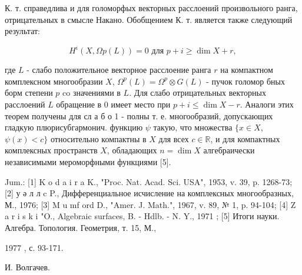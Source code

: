 \documentclass[10pt]{article}
\begin{document}
К. т. справедлива и для голоморфых векторных расслоений произвольного ранга, отрицательных в смысле Накано. Обобщением К. т. является также следующий результат:



\[

H^{i}(X, \Omega p(L))=0 \text { для } p+i \geqslant \operatorname{dim} X+r,

\]



где $L$ - слабо положительное векторное расслоение ранга $r$ на компактном комплексном многообразии $X$, $\Omega^{p}(L)=\Omega^{p} \otimes G(L)$ - пучок голомор бных борм степени $p$ co значениями в $L$. Для слабо отрицательных векторных расслоений $L$ обращение в 0 имеет место при $p+i \leqslant \operatorname{dim} X-r$. Аналоги этих теорем получены для сл а б о 1 - полны т. е. многообразий, допускающих гладкую плюрисубгармонич. функцию $\psi$ такую, что множества $\{x \in X$, $\psi(x)<c\}$ относительно компактны в $X$ для всех $c \in \mathbb{R}$, и для компактных комплексных пространств $X$, обладающих $n=\operatorname{dim} X$ алгебраически независимыми мероморфными функциями [5].



Jum.: [1] K o d a i r a K., "Proc. Nat. Acad. Sci. USA", 1953, v. 39, p. 1268-73; [2] у ә л л c P., Дифференциальное исчисление на комплексных многообразных, М., 1976; [3] M u mf ord D., "Amer. J. Math.", 1967, v. 89, № 1, p. 94-104; [4] Z a r i s k i "O., Algebraic surfaces, B. - Hdlb. - N. Y., 1971 ; [5] Итоги науки. Алгебра. Топология. Геометрия, т. 15, М.,

1977 , с. 93-171.

И. Волгачев.
\end{document}
